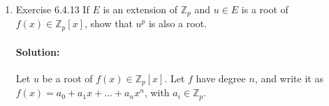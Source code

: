 \documentclass{article}
\begin{document}
\begin{enumerate}
\begin{enumerate}
     \begin{proof} 
        Let $q\neq p$. Then let $\sigma:\mathbb{Q}(u)\to \mathbb{Q}(u)$ be the automorphism fixing $\mathbb{Q}$ and 
        $u\mapsto u^{q}$. Then write $m(x)=a_0+a_1x+\ldots+a_nx^{n}$
        \begin{align*}
            m(u^{q})&=m(\sigma(u))\\
            &=a_0+a_1\sigma(u)+\ldots+a_n\sigma(u)^{n}\\
            &=  \sigma(a_0)+\sigma(a_1)\sigma(u)+\ldots+\sigma(a_n)\sigma(u)^{n} \\
            &=  \sigma(a_0)+\sigma(a_1u)+\ldots+\sigma(a_nu^{n}) \\
            &=  \sigma(a_0+a_1u+\ldots+a_nu^{n}) \\
            &=  \sigma(m(u))\\
            &=\sigma(0)\\
            &=0
        .\end{align*}

    \end{proof}

\item Conclude that $m(x)=\Phi_p(x)$ and that therefore $\Phi_p(x)$ is irreducible.
    \paragraph{Solution:} We see already that $\Phi_p(x)$ is monic and that $\Phi_p(u)=0$.
    Since $\Phi_p(x)=0$, we can say that $m(x)|\Phi_p(x)$ (The minimal polynomial of $u$ must divide 
    any polynomial that has $u$ as a root). 

    And since both polynomials divide each other we can say that $\Phi=m$.
\end{enumerate}

\item Exercise 6.4.13 If $E$ is an extension of ${\mathbb Z}_p$ and $u\in E$ is a root of $f(x)\in {\mathbb Z}_p[x]$, show that $u^p$ is also a root.
    \paragraph{Solution:} Let $u$ be a root of $f(x)\in \mathbb{Z}_p[x]$. Let $f$ have degree $n$,
    and write it as $f(x)=a_0+a_1x+\ldots+a_nx^{n}$, with $a_i \in \mathbb{Z}_p$.


\end{enumerate}
\end{document}
